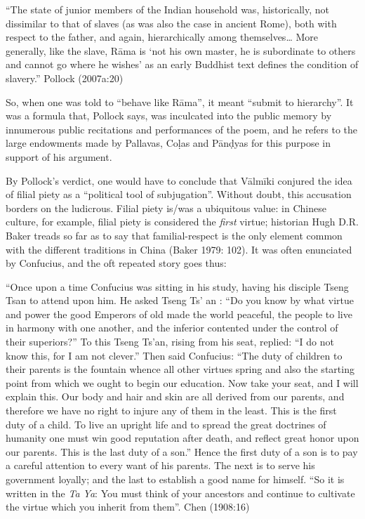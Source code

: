 \begin{myquote}
“The state of junior members of the Indian household was, historically, not dissimilar to that of slaves (as was also the case in ancient Rome), both with respect to the father, and again, hierarchically among themselves… More generally, like the slave, Rāma is ‘not his own master, he is subordinate to others and cannot go where he wishes’ as an early Buddhist text defines the condition of slavery.” 				                                        
\hfill Pollock (2007a:20)
\end{myquote}

So, when one was told to “behave like Rāma”, it meant “submit to hierarchy”. It was a formula that, Pollock says, was inculcated into the public memory by innumerous public recitations and performances of the poem, and he refers to the large endowments made by Pallavas, Coḷas and Pānḍyas for this purpose in support of his argument.

By Pollock’s verdict, one would have to conclude that Vālmīki conjured the idea of filial piety as a “political tool of subjugation”. Without doubt, this accusation borders on the ludicrous. Filial piety is/was a ubiquitous value: in Chinese culture, for example, filial piety is considered the {\sl first} virtue; historian Hugh D.R. Baker treads so far as to say that familial-respect is the only element common with the different traditions in China (Baker 1979: 102). It was often enunciated by Confucius, and the oft repeated story goes thus: 

\begin{myquote}
“Once upon a time Confucius was sitting in his study, having his disciple Tseng Tsan to attend upon him. He asked Tseng Ts' an : “Do you know by what virtue and power the good Emperors of old made the world peaceful, the people to live in harmony with one another, and the inferior contented under the control of their superiors?” To this Tseng Ts'an, rising from his seat, replied: “I do not know this, for I am not clever.” Then said Confucius: “The duty of children to their parents is the fountain whence all other virtues spring and also the starting point from which we ought to begin our education. Now take your seat, and I will explain this. Our body and hair and skin are all derived from our parents, and therefore we have no right to injure any of them in the least. This is the first duty of a child. To live an upright life and to spread the great doctrines of humanity one must win good reputation after death, and reflect great honor upon our parents. This is the last duty of a son.” Hence the first duty of a son is to pay a careful attention to every want of his parents. The next is to serve his government loyally; and the last to establish a good name for himself. “So it is written in the {\sl Ta Ya}: You must think of your ancestors and continue to cultivate the virtue which you inherit from them”.
\hfill Chen (1908:16)	 
\end{myquote}

